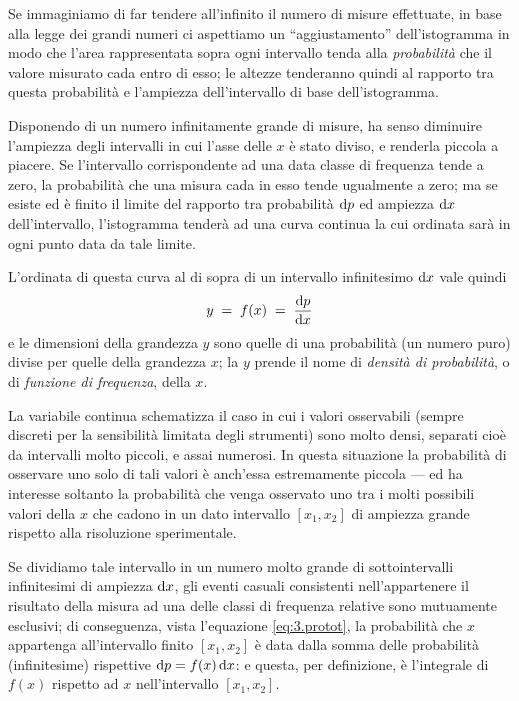 Se immaginiamo di far tendere all'infinito il numero di
misure effettuate, in base alla legge dei grandi numeri ci
aspettiamo un ``aggiustamento'' dell'istogramma in modo che
l'area rappresentata sopra ogni intervallo tenda alla
\emph{probabilit\`a} che il valore misurato cada entro di
esso; le altezze tenderanno quindi al rapporto tra questa
probabilit\`a e l'ampiezza dell'intervallo di base
dell'istogramma.

Disponendo di un numero infinitamente grande di misure, ha
senso diminuire l'ampiezza degli intervalli in cui l'asse
delle $x$ \`e stato diviso, e renderla piccola a piacere.%
Se l'intervallo corrispondente ad una data classe di
frequenza tende a zero, la probabilit\`a che una misura cada
in esso tende ugualmente a zero; ma se esiste ed \`e finito
il limite del rapporto tra probabilit\`a $\mathrm{d} p$ ed ampiezza
$\mathrm{d} x$ dell'intervallo, l'istogramma tender\`a ad una curva
continua la cui ordinata sar\`a in ogni punto data da tale
limite.

L'ordinata di questa curva al di sopra di un intervallo
infinitesimo $\mathrm{d} x$ vale quindi
\begin{equation*}
  y \; = \; f(x) \; = \; \frac{\mathrm{d} p}{\mathrm{d} x}
\end{equation*}
e le dimensioni della grandezza $y$ sono quelle di una
probabilit\`a (un numero puro) divise per quelle della
grandezza $x$; la $y$ prende il nome di \emph{densit\`a di
  probabilit\`a}, o di \emph{funzione di frequenza}, della
$x$.

La variabile continua schematizza il caso in cui i valori
osservabili (sempre discreti per la sensibilit\`a limitata
degli strumenti) sono molto densi, separati cio\`e da
intervalli molto piccoli, e assai numerosi.  In questa
situazione la probabilit\`a di osservare uno solo di tali
valori \`e anch'essa estremamente piccola --- ed ha
interesse soltanto la probabilit\`a che venga osservato uno
tra i molti possibili valori della $x$ che cadono in un dato
intervallo $ [ x_1 , x_2 ] $ di ampiezza grande rispetto
alla risoluzione sperimentale.

Se dividiamo tale intervallo in un numero molto grande di
sottointervalli infinitesimi di ampiezza $\mathrm{d} x$, gli eventi
casuali consistenti nell'appartenere il risultato della
misura ad una delle classi di frequenza relative sono
mutuamente esclusivi; di conseguenza, vista l'equazione
\eqref{eq:3.protot}, la probabilit\`a che $x$ appartenga
all'intervallo finito $ [ x_1, x_2 ] $ \`e data dalla somma
delle probabilit\`a (infinitesime) rispettive $ \mathrm{d} p = f(x)
\, \mathrm{d} x $: e questa, per definizione, \`e l'integrale di
$f(x)$ rispetto ad $x$ nell'intervallo $ [ x_1, x_2 ] $.

